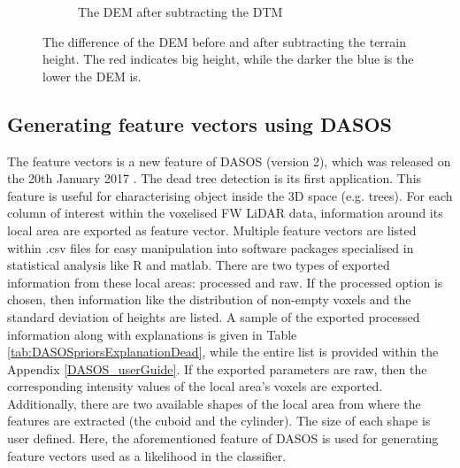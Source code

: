 \documentclass{subfiles}
\begin{document}
\begin{figure} [h!]
\begin{subfigure}[t]{.49\textwidth}
		\caption{The DEM after subtracting the DTM} 
		\label{fig:height_dtm}
	\end{subfigure} \hfill
	\caption[Before and after subtracting the DTM.]{The difference of the DEM before and after subtracting the terrain height. The  red indicates big height, while the darker the blue is the lower the DEM is.}  
	\label{fig:height_minus_dtm} 
\end{figure}


\subsection{Generating feature vectors using DASOS}\label{sec:3DpriorsGeneration}

\par The feature vectors is a new feature of DASOS (version 2), which was released on the 20th January 2017 \cite{DASOS_v2}. The dead tree detection is its first application. This feature is useful for characterising object inside the 3D space (e.g. trees). For each column of interest within the voxelised FW LiDAR data, information around its local area are exported as feature vector. Multiple feature vectors are listed within .csv files for easy manipulation into software packages specialised in statistical analysis like R and matlab. There are two types of exported information from these local areas: processed and raw. If the processed option is chosen, then information like the distribution of non-empty voxels and the standard deviation of heights are listed. A sample of the exported processed information along with explanations is given in Table \ref{tab:DASOSpriorsExplanationDead}, while the entire list is provided within the Appendix \ref{DASOS_userGuide}. If the exported parameters are raw, then the corresponding intensity values of the local area's voxels are exported. Additionally, there are two available shapes of the local area from where the features are extracted (the cuboid and the cylinder). The size of each shape is user defined. Here, the aforementioned feature of DASOS is used for generating feature vectors used as a likelihood in the classifier. 
\end{document}
